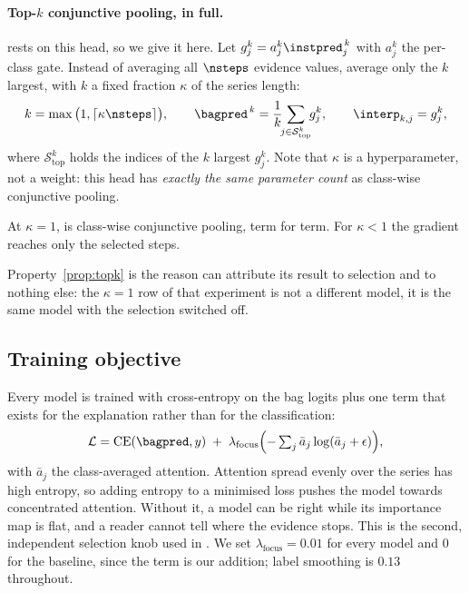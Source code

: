 \paragraph{Top-$k$ conjunctive pooling, in full.}
 rests on this head, so we give it here. Let $g_j^k = a_j^k \instpred_j^{\,k}$
with $a_j^k$ the per-class gate. Instead of averaging all $\nsteps$ evidence values, average only the
$k$ largest, with $k$ a fixed fraction $\kappa$ of the series length:
\begin{equation}
  k = \max\big(1, \lceil \kappa \nsteps \rceil\big),
  \qquad
  \bagpred^{\,k} = \frac{1}{k}\!\!\sum_{j \in \mathcal{S}^k_{\mathrm{top}}}\!\! g_j^k,
  \qquad
  \interp_{k,j} = g_j^k ,
  \label{eq:topk}
\end{equation}
where $\mathcal{S}^k_{\mathrm{top}}$ holds the indices of the $k$ largest $g_j^k$. Note that
$\kappa$ is a hyperparameter, not a weight: this head has \emph{exactly the same parameter count} as
class-wise conjunctive pooling.

\begin{property}
\label{prop:topk}
At $\kappa = 1$,  is class-wise conjunctive pooling, term for term. For $\kappa < 1$
the gradient reaches only the selected steps.
\end{property}

Property~\ref{prop:topk} is the reason  can attribute its result to selection
and to nothing else: the $\kappa = 1$ row of that experiment is not a different model, it is the
same model with the selection switched off.

\subsection{Training objective}
\label{sec:design:loss}

Every model is trained with cross-entropy on the bag logits plus one term that exists for the
explanation rather than for the classification:
\begin{equation}
  \mathcal{L} = \mathrm{CE}(\bagpred, y)
  \;+\; \lambda_{\mathrm{focus}} \Big({-}\textstyle\sum_{j} \bar a_j \log(\bar a_j + \epsilon)\Big),
  \label{eq:loss}
\end{equation}
with $\bar a_j$ the class-averaged attention. Attention spread evenly over the series has high
entropy, so adding entropy to a minimised loss pushes the model towards concentrated attention.
Without it, a model can be right while its importance map is flat, and a reader cannot tell where
the evidence stops. This is the second, independent selection knob used in . We
set $\lambda_{\mathrm{focus}} = 0.01$ for every \seanet{} model and $0$ for the \millet{} baseline,
since the term is our addition; label smoothing is $0.13$ throughout.
